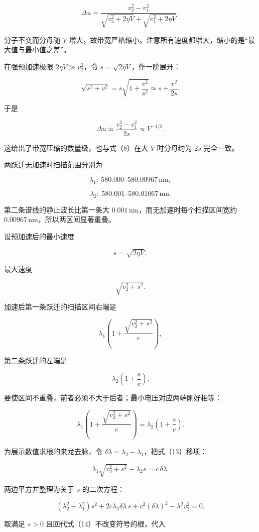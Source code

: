 \documentclass[12pt,a4paper,UTF8]{ctexart}
\begin{document}
\[
\Delta u
=\frac{v_2^2-v_1^2}
{\sqrt{v_2^2+2\eta V}+\sqrt{v_1^2+2\eta V}},
\tag{8}
\]

分子不变而分母随 \(V\)
增大，故带宽严格缩小。注意所有速度都增大，缩小的是``最大值与最小值之差''。

在强预加速极限 \(2\eta V\gg v_2^2\)，令
\(s=\sqrt{2\eta V}\)，作一阶展开：

\[
\sqrt{s^2+v^2}
=s\sqrt{1+\frac{v^2}{s^2}}
\simeq s+\frac{v^2}{2s}.
\]

于是

\[
\Delta u\simeq\frac{v_2^2-v_1^2}{2s}
\propto V^{-1/2}.
\]

这给出了带宽压缩的数量级，也与式（8）在大 \(V\) 时分母约为 \(2s\)
完全一致。

两跃迁无加速时扫描范围分别为

\[
\boxed{
\lambda_1:\ 580.000\text{--}580.00967\,\mathrm{nm}
},
\tag{9}
\]

\[
\boxed{
\lambda_2:\ 580.001\text{--}580.01067\,\mathrm{nm}
}.
\tag{10}
\]

第二条谱线的静止波长比第一条大
\(0.001\,\mathrm{nm}\)，而无加速时每个扫描区间宽约
\(0.00967\,\mathrm{nm}\)，所以两区间显著重叠。

设预加速后的最小速度

\[
s=\sqrt{2\eta V},
\tag{11}
\]

最大速度

\[
\sqrt{v_2^2+s^2}.
\tag{12}
\]

加速后第一条跃迁的扫描区间右端是

\[
\lambda_1\left(1+\frac{\sqrt{v_2^2+s^2}}c\right),
\]

第二条跃迁的左端是

\[
\lambda_2\left(1+\frac sc\right).
\]

要使区间不重叠，前者必须不大于后者；最小电压对应两端刚好相等：

\[
\lambda_1\left(1+\frac{\sqrt{v_2^2+s^2}}c\right)
=
\lambda_2\left(1+\frac sc\right).
\tag{13}
\]

为展示数值求根的来龙去脉，令
\(\delta\lambda=\lambda_2-\lambda_1\)，把式（13）移项：

\[
\lambda_1\sqrt{v_2^2+s^2}
-\lambda_2s
=c\,\delta\lambda.
\tag{14}
\]

两边平方并整理为关于 \(s\) 的二次方程：

\[
(\lambda_2^2-\lambda_1^2)s^2
+2c\lambda_2\delta\lambda\,s
+c^2(\delta\lambda)^2
-\lambda_1^2v_2^2=0.
\tag{15}
\]

取满足 \(s>0\) 且回代式（14）不改变符号的根，代入
\end{document}

